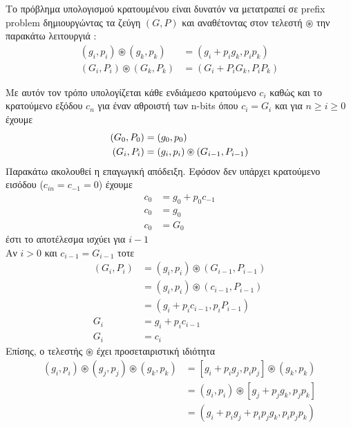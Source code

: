 Το πρόβλημα υπολογισμού κρατουμένου είναι δυνατόν να μετατραπεί σε
prefix problem δημιουργώντας τα ζεύγη $(G,P)$ και αναθέτοντας στον τελεστή
$\circledast$ την παρακάτω λειτουργιά :
\begin{equation}
\begin{split}
(g_i,p_i) \circledast (g_k,p_k) &= (g_i + p_ig_k , p_ip_k)\\
(G_i,P_i) \circledast (G_k,P_k) &= (G_i + P_iG_k , P_iP_k)
\end{split}
\end{equation}

Με αυτόν τον τρόπο υπολογίζεται κάθε ενδιάμεσο κρατούμενο $c_i$
καθώς και το κρατούμενο εξόδου $c_n$ για έναν αθροιστή των n-bits όπου $c_i = G_i$
και για $n \geq i \geq 0$ έχουμε 
\begin{equation}
\equationame{Αλγεβρικός ορισμός των $(G_i,P_i)$}
\begin{split}
(G_0,P_0) &= (g_0,p_0)\\
(G_i,P_i) &= (g_i,p_i) \circledast (G_{i-1},P_{i-1})
\end{split}
\end{equation}
Παρακάτω ακολουθεί η επαγωγική απόδειξη.
Εφόσον δεν υπάρχει κρατούμενο εισόδου ($c_{in} = c_{-1} = 0$) έχουμε 
\begin{equation*}
\begin{split}
    c_0 &= g_0 + p_0c_{-1} \\
    c_0 &= g_0 \\
    c_0 &= G_0
\end{split}
\end{equation*}
έστι το αποτέλεσμα ισχύει για $i-1$ \\
Αν $i>0$ και $c_{i-1} = G_{i-1}$ τοτε
\begin{equation*}
\begin{split} 
    (G_i,P_i)   &= (g_i,p_i) \circledast (G_{i-1},P_{i-1}) \\
                &= (g_i,p_i) \circledast (c_{i-1},P_{i-1}) \\
                &= (g_i + p_ic_{i-1} , p_iP_{i-1}) \\
            G_i &= g_i + p_ic_{i-1} \\
            G_i &= c_i
\end{split}
\end{equation*}
Επίσης, ο τελεστής $\circledast$ έχει προσεταιριστική ιδιότητα 
\begin{equation*}
\begin{split} 
    (g_i,p_i)\circledast(g_j,p_j)\circledast(g_k,p_k) &= [g_i + p_ig_j,p_ip_j]\circledast(g_k,p_k) \\
    &= (g_i,p_i)\circledast[g_j + p_jg_k,p_jp_k]\\
    &= ( g_i + p_ig_j + p_ip_jg_k , p_ip_jp_k )
\end{split}
\end{equation*}

